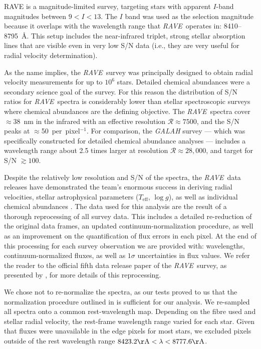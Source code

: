 \documentclass[preprint2,trackchanges]{aastex}
\newcommand{\project}[1]{\textsl{#1}}
\newcommand{\acronym}[1]{{\small{#1}}}
\newcommand{\rave}{\project{\acronym{RAVE}}}
\newcommand{\logg}{\log g}
\newcommand{\teff}{T_{\mathrm{eff}}}
\begin{document}
RAVE is a magnitude-limited survey, targeting stars with apparent $I$-band
magnitudes between $9 < I < 13$.  The $I$ band was used as the selection
magnitude because it overlaps with the wavelength range that \rave\ operates in:
8410--8795~\AA.  This setup includes the  near-infrared triplet,
strong stellar absorption lines that are visible even in very low S/N data 
(i.e., they are very useful for radial velocity determination).  


As the name implies, the \rave\ survey was principally designed to obtain radial
velocity measurements for up to $10^6$ stars.  Detailed chemical abundances were
a secondary science goal of the survey.  For this reason the distribution
of S/N ratios for \rave\ spectra is considerably lower than stellar 
spectroscopic surveys where chemical abundances are the defining objective.  The 
\rave\ spectra cover $\approx38$~nm in the infrared with an effective resolution
$\mathcal{R} \approx 7500$, and the S/N peaks at $\approx$50~per~pixel$^{-1}$.
For comparison, the \project{GALAH} survey \citep{DaSilva_2015} --- which was 
specifically constructed for detailed chemical abundance analyses --- includes a
wavelength range about 2.5 times larger at resolution $\mathcal{R} \approx 28,000$,
and target for S/N $\gtrsim100$.


Despite the relatively low resolution and S/N of the spectra, the \rave\ data
releases have demonstrated the team's enormous success in deriving radial 
velocities, stellar astrophysical parameters ($\teff$, $\logg$), as well as 
individual chemical abundances \citep{Steinmetz_2006,Zwitter_2008,Siebert_2011,
Kordopatis_2014, Kunder_2016}.  The data used for this analysis are the result
of a thorough reprocessing of all survey data.  This includes a detailed
re-reduction of the original data frames, an updated continuum-normalization
procedure, as well as an improvement on the quantification of flux errors in
each pixel.  At the end of this processing for each survey observation we are 
provided with: wavelengths, continuum-normalized fluxes, as well as 
$1\sigma$ uncertainties in flux values.  We refer the reader to the official 
fifth data release paper of the \rave\ survey, as presented by
\citet{Kunder_2016}, for more details of this reprocessing.


We chose not to re-normalize the spectra, as our tests proved to us that the
normalization procedure outlined in \citet{Kunder_2016} is sufficient for our
analysis.  We re-sampled all spectra onto a common rest-wavelength map.
Depending on the fibre used and stellar radial velocity, the rest-frame wavelength
range varied for each star.  Given that fluxes were unavailable in the edge
pixels for most stars, we excluded pixels outside of the rest wavelength range
$8423.2{\rm \AA} < \lambda < 8777.6{\rm \AA}$.
\end{document}
